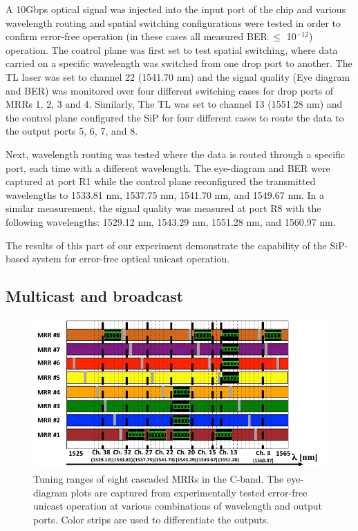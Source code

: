 A 10Gbps optical signal was injected into the input port of the chip and various wavelength routing and spatial switching configurations were tested in order to confirm error-free operation (in these cases all measured BER $\leq$ 10$^{-12}$) operation. The control plane was first set to test spatial switching, where data carried on a specific wavelength was switched from one drop port to another. The TL laser was set to channel 22 (1541.70 nm) and the signal quality (Eye diagram and BER) was monitored over four different switching cases for drop ports of MRRs 1, 2, 3 and 4. Similarly, The TL was set to channel 13 (1551.28 nm) and the control plane configured the SiP for four different cases to route the data to the output ports 5, 6, 7, and 8. 

Next, wavelength routing was tested where the data is routed through a specific port, each time with a different wavelength. The eye-diagram and BER were captured at port R1 while the control plane reconfigured the transmitted wavelengths to 1533.81 nm, 1537.75 nm, 1541.70 nm, and 1549.67 nm. In a similar measurement, the signal quality was measured at port R8 with the following wavelengths: 1529.12 nm, 1543.29 nm, 1551.28 nm, and 1560.97 nm.

The results of this part of our experiment demonstrate the capability of the SiP-based system for error-free optical unicast operation.


\subsection{Multicast and broadcast}

\begin{figure}[t!]
\begin{center}
\includegraphics[width=13cm]{Chapter3/fig6.pdf}
\caption{Tuning ranges of eight cascaded MRRs in the C-band. The eye-diagram plots are captured from experimentally tested error-free unicast operation at various combinations of wavelength and output ports. Color strips are used to differentiate the outputs. }
\label{fig6}
\end{center}
\vspace{-0.9cm}
\end{figure}

